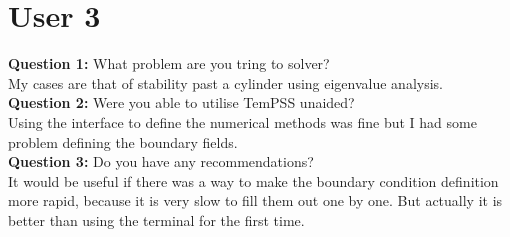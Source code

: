 \documentclass[11pt, a4paper]{report}
\begin{document}
\section{User 3}
\textbf{Question 1:} What problem are you tring to solver?\\
My cases are that of stability past a cylinder using eigenvalue analysis.\\
\textbf{Question 2:} Were you able to utilise TemPSS unaided?\\
Using the interface to define the numerical methods was fine but I had some problem defining the boundary fields.\\
\textbf{Question 3:} Do you have any recommendations?\\
It would be useful if there was a way to make the boundary condition definition more rapid, because it is very slow to fill them out one by one. But actually it is better than using the terminal for the first time.

\end{document}
